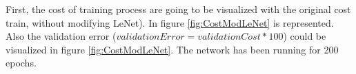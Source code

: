 
First, the cost of training process are going to be visualized with the original cost train, without modifying LeNet). In figure \ref{fig:CostModLeNet} is represented. Also the validation error ($validationError = validationCost*100$) could be visualized in figure \ref{fig:CostModLeNet}. The network has been running for 200 epochs.\\

\begin{figure}[htb]    \centering

\end{figure}
